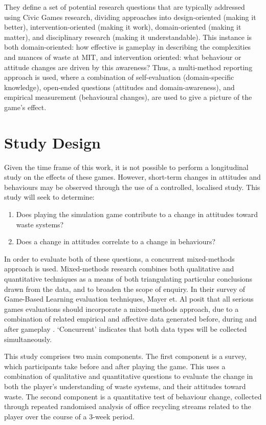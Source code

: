 \documentclass[nofonts,nols,justified,nobib]{tufte-book}
\begin{document}
They define a set of potential research questions that are typically addressed using Civic Games research, dividing approaches into design-oriented (making it better), intervention-oriented (making it work), domain-oriented (making it matter), and disciplinary research (making it understandable). This instance is both domain-oriented: how effective is gameplay in describing the complexities and nuances of waste at MIT, and intervention oriented: what behaviour or attitude changes are driven by this awareness? Thus, a multi-method reporting approach is used, where a combination of self-evaluation (domain-specific knowledge), open-ended questions (attitudes and domain-awareness), and empirical measurement (behavioural changes), are used to give a picture of the game's effect.

\section*{Study Design}

Given the time frame of this work, it is not possible to perform a longitudinal study on the effects of these games. However, short-term changes in attitudes and behaviours may be observed through the use of a controlled, localised study. This study will seek to determine:
\begin{enumerate}
\item Does playing the simulation game contribute to a change in attitudes toward waste systems?
\item Does a change in attitudes correlate to a change in behaviours?
\end{enumerate}

In order to evaluate both of these questions, a concurrent mixed-methods approach is used. Mixed-methods research combines both qualitative and quantitative techniques as a means of both triangulating particular conclusions drawn from the data, and to broaden the scope of enquiry. In their survey of Game-Based Learning evaluation techniques, Mayer et. Al posit that all serious games evaluations should incorporate a mixed-methods approach, due to a combination of related empirical and affective data generated before, during and after gameplay \cite{mayer_research_2014}. `Concurrent' indicates that both data types will be collected simultaneously.

This study comprises two main components. The first component is a survey, which participants take before and after playing the game. This uses a combination of qualitative and quantitative questions to evaluate the change in both the player's understanding of waste systems, and their attitudes toward waste. The second component is a quantitative test of behaviour change, collected through repeated randomised analysis of office recycling streams related to the player over the course of a 3-week period.
\end{document}
